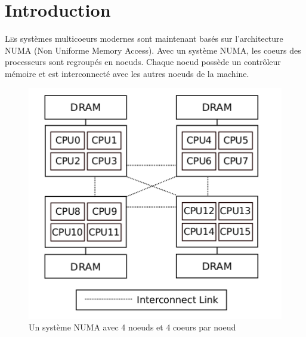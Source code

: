 \chapter{Introduction}

  \lettrine[nindent=0em,lines=3]{L} es systèmes multicoeurs modernes sont
  maintenant basés sur l'architecture NUMA (Non Uniforme Memory Access). Avec un
  système NUMA, les coeurs des processeurs sont regroupés en noeuds. Chaque
  noeud possède un contrôleur mémoire et est interconnecté avec les autres
  noeuds de la machine.

  \begin{figure}[H]
    \centering
    \includegraphics[scale=0.35]{img/numa_arch.png}
    \caption{Un système NUMA avec 4 noeuds et 4 coeurs par noeud}
    \label{f:numa_arch}
  \end{figure}

